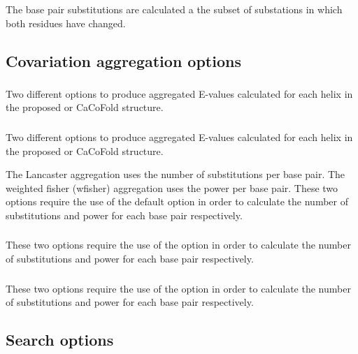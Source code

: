 \subsubsection{} The base pair substitutions are calculated a the subset of substations in which both residues have changed.

\subsection{Covariation aggregation options}

\subsubsection{} Two different options to produce aggregated E-values calculated for each helix in the proposed or CaCoFold structure.

\subsubsection{} Two different options to produce aggregated E-values calculated for each helix in the proposed or CaCoFold structure.

The Lancaster aggregation uses the number of substitutions per base pair. The weighted fisher (wfisher) aggregation uses the power per base pair. These two options require the use of the default option \textbf{} in order to calculate the number of substitutions and power for each base pair respectively.

\subsubsection{}
These two options require the use of the option \textbf{} in order to calculate the number of substitutions and power for each base pair respectively.

\subsubsection{}
 These two options require the use of the option \textbf{} in order to calculate the number of substitutions and power for each base pair respectively.


\subsection{Search options}


